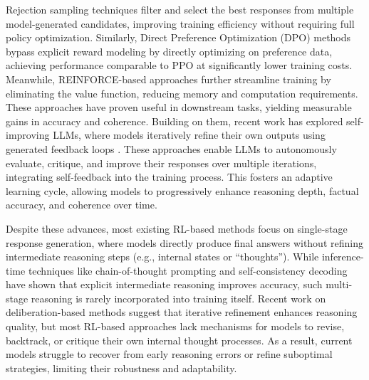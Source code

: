 Rejection sampling techniques \citep{zelikman2022star,dong2023raft,gulcehre2023reinforced} filter and select the best responses from multiple model-generated candidates, improving training efficiency without requiring full policy optimization. Similarly, Direct Preference Optimization (DPO) methods \citep{rafailov2023direct,munos2023nash,ethayarajh2024kto} bypass explicit reward modeling by directly optimizing on preference data, achieving performance comparable to PPO at significantly lower training costs. Meanwhile, REINFORCE-based approaches \citep{ahmadian2024back, li2023remax,ahmadian2024back,shao2024deepseekmath} further streamline training by eliminating the value function, reducing memory and computation requirements.
These approaches have proven useful in downstream tasks, yielding measurable gains in accuracy and coherence.
Building on them, recent work has explored self-improving LLMs, where models iteratively refine their own outputs using generated feedback loops \citep{xu2023some,snorkelai@pair,xiong2023iterative,yuan2024self,dong2024rlhf,guo2024direct}. These approaches enable LLMs to autonomously evaluate, critique, and improve their responses over multiple iterations, integrating self-feedback into the training process. This fosters an adaptive learning cycle, allowing models to progressively enhance reasoning depth, factual accuracy, and coherence over time.

Despite these advances, most existing RL-based methods focus on single-stage response generation, where models directly produce final answers without refining intermediate reasoning steps (e.g., internal states or “thoughts”). While inference-time techniques like chain-of-thought prompting \citep{wei2022chain} and self-consistency decoding \citep{wang2022self} have shown that explicit intermediate reasoning improves accuracy, such multi-stage reasoning is rarely incorporated into training itself. Recent work on deliberation-based methods \citep{madaan2023selfrefineiterativerefinementselffeedback} suggest that iterative refinement enhances reasoning quality, but most RL-based approaches lack mechanisms for models to revise, backtrack, or critique their own internal thought processes. As a result, current models struggle to recover from early reasoning errors or refine suboptimal strategies, limiting their robustness and adaptability.
